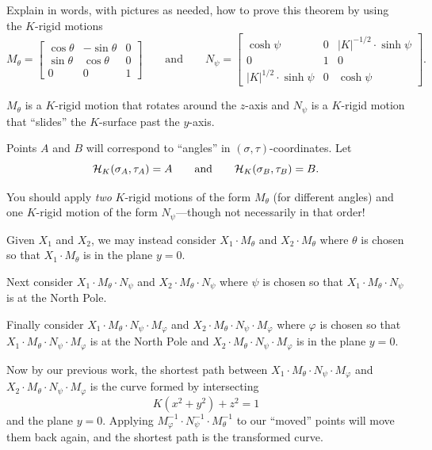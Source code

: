 \documentclass[newpage,hints,,12pt,noauthor,nooutcomes,handout]{ximera}
\begin{document}
\begin{problem}
  Explain in words, with pictures as needed, how to prove this theorem
  by using the $K$-rigid motions
  \[
  M_\theta=
  \begin{bmatrix}
    \cos\theta & -\sin\theta & 0\\
    \sin\theta & \cos\theta & 0\\
    0 & 0 & 1
  \end{bmatrix}
  \qquad\text{and}\qquad
  N_\psi=
  \begin{bmatrix}
    \cosh\psi & 0 & |K|^{-1/2}\cdot\sinh\psi\\
    0 & 1 & 0\\
    |K|^{1/2}\cdot\sinh\psi & 0 & \cosh\psi
  \end{bmatrix}.
  \]
  \begin{hint}
    $M_\theta$ is a $K$-rigid motion that rotates around the $z$-axis and $N_\psi$
    is a $K$-rigid motion that ``slides'' the $K$-surface past the $y$-axis.
  \end{hint}
  \begin{hint}
    Points $A$ and $B$ will correspond to ``angles'' in
    $(\sigma,\tau)$-coordinates. Let
    \[
    \mathcal{H}_K(\sigma_A,\tau_A) = A\qquad\text{and}\qquad \mathcal{H}_K(\sigma_B,\tau_B) = B.
    \]
  \end{hint}
  \begin{hint}
    You should apply \textit{two} $K$-rigid motions of the form
    $M_\theta$ (for different angles) and one $K$-rigid motion of the
    form $N_\psi$---though not necessarily in that order!
  \end{hint}
  \begin{freeResponse}
    Given $X_1$ and $X_2$, we may instead consider $X_1\cdot M_\theta$
    and $X_2\cdot M_\theta$ where $\theta$ is chosen so that $X_1\cdot
    M_\theta$ is in the plane $y=0$.

    Next consider $X_1\cdot M_\theta\cdot N_\psi$ and $X_2\cdot
    M_\theta\cdot N_\psi$ where $\psi$ is chosen so that $X_1\cdot
    M_\theta\cdot N_\psi$ is at the North Pole.

    Finally consider $X_1\cdot M_\theta\cdot N_\psi\cdot M_\varphi$
    and $X_2\cdot M_\theta\cdot N_\psi\cdot M_\varphi$ where $\varphi$
    is chosen so that $X_1\cdot M_\theta\cdot N_\psi\cdot M_\varphi$
    is at the North Pole and $X_2\cdot M_\theta\cdot N_\psi\cdot
    M_\varphi$ is in the plane $y=0$.

    Now by our previous work, the shortest path between $X_1\cdot
    M_\theta\cdot N_\psi\cdot M_\varphi$ and $X_2\cdot M_\theta\cdot
    N_\psi\cdot M_\varphi$ is the curve formed by intersecting
    \[
    K(x^2+y^2)+z^2=1
    \]
    and the plane $y=0$. Applying $M_\varphi^{-1}\cdot
    N_\psi^{-1}\cdot M_\theta^{-1}$ to our ``moved'' points will move
    them back again, and the shortest path is the transformed curve.
  \end{freeResponse}
\end{problem}
\end{document}
